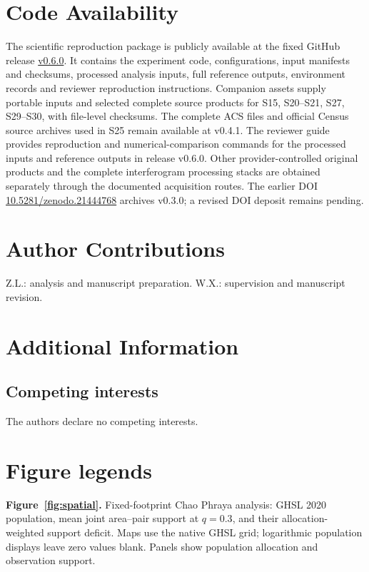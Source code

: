 \documentclass[pdflatex,sn-nature]{sn-jnl}
\begin{document}
\section*{Code Availability}
The scientific reproduction package is publicly available at the fixed GitHub release \href{https://github.com/niubisile-wq/openinsar-observability-bias/releases/tag/v0.6.0}{v0.6.0}. It contains the experiment code, configurations, input manifests and checksums, processed analysis inputs, full reference outputs, environment records and reviewer reproduction instructions. Companion assets supply portable inputs and selected complete source products for S15, S20--S21, S27, S29--S30, with file-level checksums. The complete ACS files and official Census source archives used in S25 remain available at v0.4.1. The reviewer guide provides reproduction and numerical-comparison commands for the processed inputs and reference outputs in release v0.6.0. Other provider-controlled original products and the complete interferogram processing stacks are obtained separately through the documented acquisition routes. The earlier DOI \href{https://doi.org/10.5281/zenodo.21444768}{10.5281/zenodo.21444768} archives v0.3.0; a revised DOI deposit remains pending.
\def\bibfont{\small}

\section*{Author Contributions}
Z.L.: analysis and manuscript preparation. W.X.: supervision and manuscript revision.
\section*{Additional Information}
\subsection*{Competing interests}
The authors declare no competing interests.
\section*{Figure legends}

\noindent\textbf{Figure~\ref{fig:spatial}.} Fixed-footprint Chao Phraya analysis: GHSL 2020 population, mean joint area--pair support at $q=0.3$, and their allocation-weighted support deficit. Maps use the native GHSL grid; logarithmic population displays leave zero values blank. Panels show population allocation and observation support.
\end{document}
